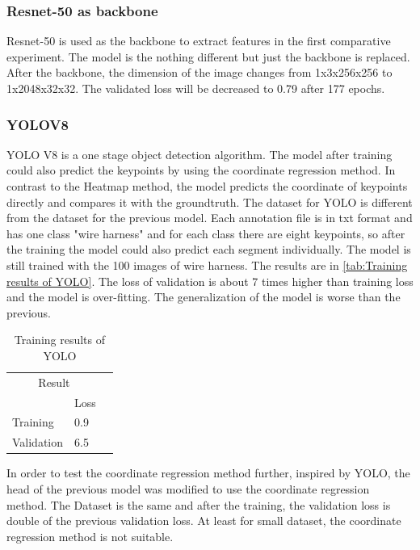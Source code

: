\subsubsection{Resnet-50 as backbone}
Resnet-50 is used as the backbone to extract features in the first comparative experiment. The model is the nothing different but just the backbone is 
replaced. After the backbone, the dimension of the image changes from 1x3x256x256 to 1x2048x32x32. The validated loss will be decreased to 0.79 after 
177 epochs.
\subsubsection{YOLOV8}
YOLO V8 is a one stage object detection algorithm. The model after training could also predict the keypoints by using the coordinate regression method.
In contrast to the Heatmap method, the model predicts the coordinate of keypoints directly and compares it with the groundtruth. The dataset for YOLO is 
different from the dataset for the previous model. Each annotation file is in txt format and has one class "wire harness" and for each class there are eight 
keypoints, so after the training the model could also predict each segment individually. The model is still trained with the 100 images of wire harness.
The results are in \autoref{tab:Training results of YOLO}. The loss of validation is about 7 times higher than training loss and the model is over-fitting.
The generalization of the model is worse than the previous. \\
\begin{table}[htb]
    \centering
    \begin{tabular}{@{}llr@{}} \toprule
    \multicolumn{2}{c}{Result}             \\ \cmidrule(r){1-2}
                 & Loss   \\ \midrule
        Training & 0.9    \\
        Validation& 6.5    \\ \bottomrule
    \end{tabular}
    \caption{Training results of YOLO} 
    \label{tab:Training results of YOLO}
    \end{table}
In order to test the coordinate regression method further, inspired by YOLO, the head of the previous model was modified to use the coordinate regression method.
The Dataset is the same and after the training, the validation loss is double of the previous validation loss. At least for small dataset, the coordinate regression
method is not suitable.
